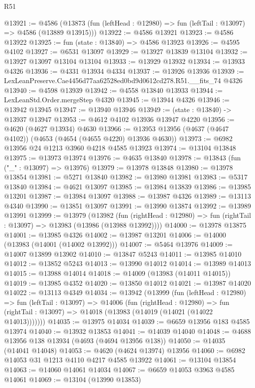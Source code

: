 \begin{lexlean}{R51}
\begin{coremodule}
@13921 := @4586
    (@13873 (fun (leftHead : @12980) => fun (leftTail : @13097) => @4586 (@13889 @13915)))
@13922 := @4586 @13921
@13923 := @4586 @13922
@13925 := fun (state : @13840) => @4586 @13923
@13926 := @4595 @4102
@13927 := @6531 @13097
@13929 := @13927 @13839 @13104
@13932 := @13927 @13097 @13104 @13104
@13933 := @13929 @13932
@13934 := @13933 @4326
@13936 := @4331 @13934 @4334
@13937 := @13926 @13936
@13939 := LexLeanPreserve.Cae4456d77aa62528ed0bd9d0612cd278.R51.__fits_74 @4326
@13940 := @4598 @13939
@13942 := @4558 @13840 @13933
@13944 := LexLeanStd.Order.mergeStep @4320
@13945 := @13944 @4326
@13946 := @13942 @13945
@13947 := @13940 @13946
@13949 := (state : @13840) -> @13937 @13947
@13953 := @4612 @4102 @13936 @13947 @4220
@13956 := @4620 (@4627 @13934) @4630
@13966 := @13953 @13956 (@4637 (@4647 @4102)) (@4653 (@4654 (@4655 @4220) @13936 @4630))
@13973 := @6982 @13956 @24 @1213 @3960 @4218 @4585 @13923
@13974 := @13104 @13848
@13975 := @13973 @13974
@13976 := @4635 @13840
@13978 := @13843 (fun ("_" : @13097) => @13976)
@13979 := @13978 @13848
@13980 := @13978 @13854
@13981 := @5271 @13840
@13982 := @13980 @13981
@13983 := @5317 @13840
@13984 := @4621 @13097
@13985 := @13984 @13839
@13986 := @13985 @13201
@13987 := @13984 @13097
@13988 := @13987 @4326
@13989 := @13113 @4340
@13990 := @13851 @13097
@13991 := @13990 @13874
@13992 := @13989 @13991
@13999 := @13979
    (@13982
      (fun (rightHead : @12980) => fun (rightTail : @13097) => @13983 (@13986 (@13988 @13992))))
@14000 := @13978 @13875
@14001 := @13985 @4326
@14002 := @13987 @13201
@14006 := @14000 (@13983 (@14001 (@14002 @13992)))
@14007 := @5464 @13976
@14009 := @14007 @13899 @13902
@14010 := @13847 @5243
@14011 := @13985 @14010
@14012 := @13852 @5243
@14013 := @13990 @14012
@14014 := @13989 @14013
@14015 := @13988 @14014
@14018 := @14009 (@13983 (@14011 @14015))
@14019 := @13985 @4352
@14020 := @13850 @14012
@14021 := @13987 @14020
@14022 := @13113 @4349
@14034 := @13942
    (@13999
      (fun (leftHead : @12980) =>
      fun (leftTail : @13097) =>
      @14006
        (fun (rightHead : @12980) =>
        fun (rightTail : @13097) => @14018 (@13983 (@14019 (@14021 (@14022 @14013)))))))
@14035 := @13975 @14034
@14039 := @6659 @13956 @183 @4585 @13974
@14040 := @13932 @13853
@14041 := @14039 @14040
@14048 := @4688 @13956 @138 @13934 (@4693 (@4694 @13956 @138))
@14050 := @14035 (@14041 @14048)
@14053 := @4620 (@4624 @13974) @13956
@14060 := @6982 @14053 @31 @1213 @4110 @4217 @4585 @13922
@14061 := @13104 @13854
@14063 := @14060 @14061 @14034
@14067 := @6659 @14053 @3963 @4585 @14061
@14069 := @13104 (@13990 @13853)

\end{coremodule}
\end{lexlean}
